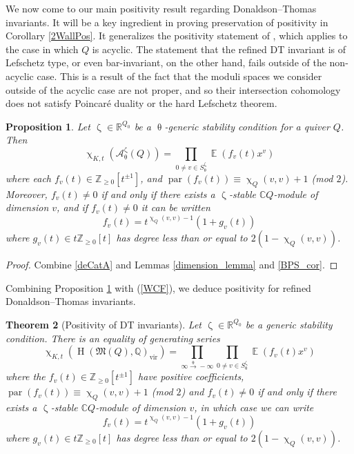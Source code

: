 \documentclass{amsart}
\newcommand{\Mst}{\mathfrak{M}}
\DeclareMathOperator{\parit}{par}
\DeclareMathOperator{\HO}{H}
\DeclareMathOperator{\vir}{vir}
\DeclareMathOperator{\EE}{\mathbb{E}}
\let\bb=\mathbb
\renewcommand{\theta}{\uptheta}
\renewcommand{\zeta}{\upzeta}
\renewcommand{\chi}{\upchi}
\theoremstyle{plain}%
\newtheorem{thm}{Theorem}[section]
\newtheorem{prop}[thm]{Proposition}
\theoremstyle{definition}
\theoremstyle{remark}
\begin{document}
We now come to our main positivity result regarding Donaldson--Thomas invariants.  It will be a key ingredient in proving preservation of positivity in Corollary \ref{2WallPos}.  It generalizes the positivity statement of \cite[Cor. 1.2]{MeiRei}, which applies to the case in which $Q$ is acyclic.  The statement that the refined DT invariant is of Lefschetz type, or even bar-invariant, on the other hand, fails outside of the non-acyclic case.  This is a result of the fact that the moduli spaces we consider outside of the acyclic case are not proper, and so their intersection cohomology does not satisfy Poincar\'e duality or the hard Lefschetz theorem.

\begin{prop}\label{Pos1}
Let $\zeta\in\mathbb{R}^{Q_0}$ be a $\theta$-generic stability condition for a quiver $Q$.  Then
\[
\chi_{K,t}(\mathcal{A}^{\zeta}_{\theta}(Q))=\prod_{0\neq v\in S_{\theta}^{\zeta}}\EE(f_v(t)x^v)
\]
where each $f_v(t)\in\mathbb{Z}_{\geq 0}[t^{\pm 1}]$, and $\parit(f_v(t))\equiv \chi_Q(v,v)+1$ (mod $2$).  Moreover, $f_v(t)\neq 0$ if and only if there exists a $\zeta$-stable $\bb{C}Q$-module of dimension $v$, and if $f_v(t)\neq 0$ it can be written
\[
f_v(t)=t^{
\chi_Q(v,v)-1}(1+g_v(t))
\]
where $g_v(t)\in t\mathbb{Z}_{\geq 0}[t]$ has degree less than or equal to $2(1-\chi_Q(v,v))$.
\end{prop}
\begin{proof}
Combine \eqref{deCatA} and Lemmas \ref{dimension_lemma} and \ref{BPS_cor}.
\end{proof}
Combining Proposition \ref{Pos1} with (\ref{WCF}), we deduce positivity for refined Donaldson--Thomas invariants.
\begin{thm}[Positivity of DT invariants]
\label{DT_pos_thm}
Let $\zeta\in \mathbb{R}^{Q_0}$ be a generic stability condition.  There is an equality of generating series 
\begin{equation*}
\chi_{K,t}(\HO(\Mst(Q),\mathbb{Q})_{\vir})=\prod_{\infty\xrightarrow{\theta} -\infty}\prod_{0\neq v\in S_{\theta}^{\zeta}}\EE(f_v(t)x^v)
\end{equation*}
where the $f_v(t)\in\mathbb{Z}_{\geq 0}[t^{\pm 1}]$ have positive coefficients, $\parit(f_v(t))\equiv \chi_Q(v,v)+1$ (mod $2$) and $f_v(t)\neq 0$ if and only if there exists a $\zeta$-stable $\bb{C}Q$-module of dimension $v$, in which case we can write
\[
f_v(t)=t^{
\chi_Q(v,v)-1}(1+g_v(t))
\]
where $g_v(t)\in t\mathbb{Z}_{\geq 0}[t]$ has degree less than or equal to $2(1-\chi_Q(v,v))$.
\end{thm}
\end{document}
